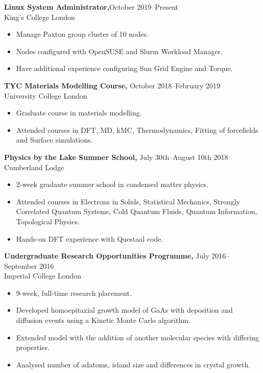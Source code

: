 \documentclass[margin]{res}
\begin{document}
\begin{resume}
{\bf Linux System Administrator,}\hfill October 2019--Present\\ King's College London
  \begin{itemize} \itemsep -2pt  %
    \item Manage Paxton group cluster of 10 nodes. 
    \item Nodes configured with OpenSUSE and Slurm Workload Manager. 
    \item Have additional experience configuring Sun Grid Engine and Torque. 
  \end{itemize}

 {\bf TYC Materials Modelling Course,} \hfill October 2018--February 2019\\ University College London
  \begin{itemize} \itemsep -2pt  %
    \item Graduate course in materials modelling.
    \item Attended courses in DFT, MD, kMC, Thermodynamics, Fitting of forcefields and Surface simulations.
  \end{itemize}

  {\bf Physics by the Lake Summer School,} \hfill July 30th--August 10th 2018\\ Cumberland Lodge
  \begin{itemize} \itemsep -2pt  %
    \item 2-week gradaute summer school in condensed matter physics.
    \item Attended courses in Electrons in Solids, Statistical Mechanics, Strongly Correlated Quantum Systems, Cold Quantum Fluids, Quantum Information, Topological Physics.
    \item Hands-on DFT experience with Questaal code. 
  \end{itemize} 
  
  
 {\bf Undergraduate Research Opportunities Programme,} \hfill July 2016--September 2016\\ Imperial College London
 \begin{itemize} \itemsep -2pt  %
   \item 9-week, full-time research placement.
   \item Developed homoepitaxial growth model of GaAs with deposition and diffusion events using a Kinetic Monte Carlo algorithm.
   \item Extended model with the addition of another molecular species with differing properties. 
   \item Analysed number of adatoms, island size and differences in crystal growth.
 \end{itemize}



\end{resume}
\end{document}
